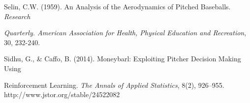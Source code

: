 \documentclass[12pt]{article}
\begin{document}
\vspace{0.8 cm}

\begin{minipage}{\textwidth}
Selin, C.W. (1959). An Analysis of the Aerodynamics of Pitched Baseballs. \textit{Research} 
\end{minipage}

\vspace{0.15 cm}

\hspace*{1cm}
\begin{minipage}{.9\textwidth}
    \textit{Quarterly. American Association for Health, Physical Education and Recreation}, 30, 232-240.
\end{minipage}

\vspace{0.8 cm}

\begin{minipage}{\textwidth}
Sidhu, G., \& Caffo, B. (2014). Moneybarl: Exploiting Pitcher Decision Making Using
\end{minipage}


\vspace{0.15 cm}

\hspace*{1cm}
\begin{minipage}{.9\textwidth}
    Reinforcement Learning. \textit{The Annals of Applied Statistics}, 8(2), 926–955. http://www.jstor.org/stable/24522082
\end{minipage}
\end{document}
